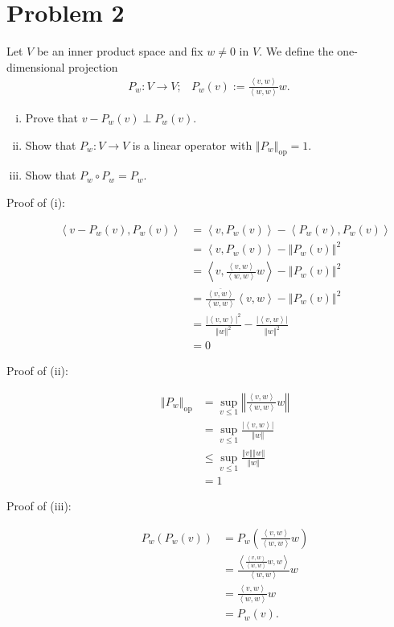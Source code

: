 \documentclass[8pt]{extarticle}
\newcommand{\iprod}[2]{\left\langle #1,#2\right\rangle}
\newcommand{\norm}[1]{\left\Vert #1\right\Vert}
\begin{document}
  \section{Problem 2}%
  Let $V$ be an inner product space and fix $w\neq 0$ in $V$. We define the one-dimensional projection
  \begin{align*}
    P_w: V\rightarrow V;&P_w(v) := \frac{\iprod{v}{w}}{\iprod{w}{w}}w.
  \end{align*}
  \begin{enumerate}[(i)]
    \item Prove that $v-P_w(v)\perp P_w(v)$.
    \item Show that $P_w:V\rightarrow V$ is a linear operator with $\norm{P_w}_{\text{op}} = 1$.
    \item Show that $P_w\circ P_w = P_w$.
  \end{enumerate}
  \begin{description}
    \item[Proof of (i):]
      \begin{align*}
        \iprod{v-P_w(v)}{P_w(v)} &= \iprod{v}{P_w(v)} - \iprod{P_w(v)}{P_w(v)}\\
                                 &= \iprod{v}{P_w(v)} - \norm{P_w(v)}^2\\
                                 &= \iprod{v}{\frac{\iprod{v}{w}}{\iprod{w}{w}}w} - \norm{P_w(v)}^2\\
                                 &= \frac{\overline{\iprod{v}{w}}}{\iprod{w}{w}}\iprod{v}{w} - \norm{P_w(v)}^2\\
                                 &= \frac{|\iprod{v}{w}|^2}{\norm{w}^2} - \frac{|\iprod{v}{w}|}{\norm{w}^2}\\
                                 &= 0
      \end{align*}
    \item[Proof of (ii):]
      \begin{align*}
        \norm{P_w}_{\text{op}} &= \sup_{v\leq 1} \norm{\frac{\iprod{v}{w}}{\iprod{w}{w}}w}\\
                               &= \sup_{v\leq 1} \frac{|\iprod{v}{w}|}{\norm{w}}\\
                               &\leq \sup_{v\leq 1}\frac{\norm{v}{\norm{w}}}{\norm{w}}\\
                               &= 1
      \end{align*}
    \item[Proof of (iii):]
      \begin{align*}
        P_w(P_w(v)) &= P_w\left(\frac{\iprod{v}{w}}{\iprod{w}{w}} w\right)\\
                    &= \frac{\iprod{\frac{\iprod{v}{w}}{\iprod{w}{w}}w}{w}}{\iprod{w}{w}}w\\
                    &= \frac{\iprod{v}{w}}{\iprod{w}{w}}w\\
                    &= P_w(v).
      \end{align*}
  \end{description}
\end{document}
